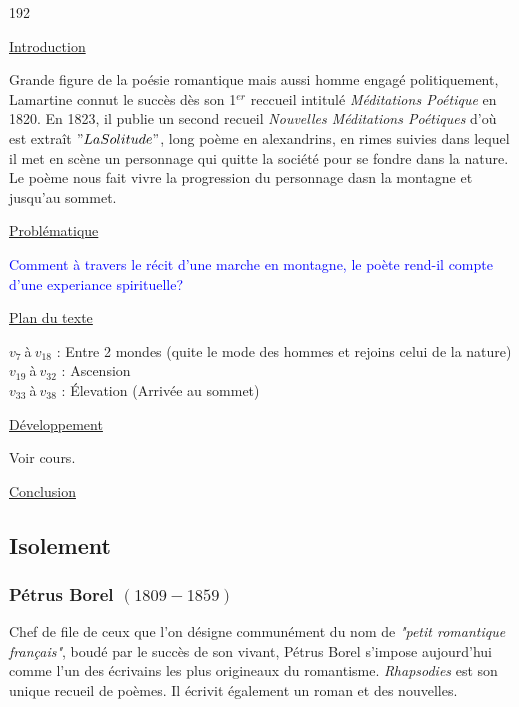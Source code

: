 \documentclass[12pt,a4paper]{article}
\begin{document}
\begin{dingautolist}{192}

\item \underline{Introduction} \par
		Grande figure de la po\'esie romantique mais aussi homme engag\'e politiquement, Lamartine connut le succ\`es d\`es son 1$^{er}$ reccueil intitul\'e \textit{M\'editations Po\'etique} en 1820. 
		En 1823, il publie un second recueil \textit{Nouvelles M\'editations Po\'etiques} d'o\`u est extra\^it $"La Solitude"$, 
		long po\`eme en alexandrins, en rimes suivies dans lequel il met en sc\`ene un personnage qui quitte la soci\'et\'e pour se fondre dans la nature. 
		Le po\`eme nous fait vivre la progression du personnage dasn la montagne et jusqu'au sommet.

\item \underline{Probl\'ematique }\par
		\textcolor{blue}{Comment \`a travers le r\'ecit d'une marche en montagne, le po\`ete rend-il compte d'une experiance spirituelle?}

\item \underline{Plan du texte} \par
		$v_{7}~$\`a$~v_{18}$ : Entre 2 mondes (quite le mode des hommes et rejoins celui de la nature)\\
		$v_{19}~$\`a$~v_{32}$ : Ascension\\
		$v_{33}~$\`a$~v_{38}$ : \'Elevation (Arriv\'ee au sommet)

\item \underline{D\'eveloppement} \par
		Voir cours.

\item \underline{Conclusion} \par


\end{dingautolist}
 \newpage

			\subsection{Isolement}
				\subsubsection{P\'etrus Borel $(1809-1859)$}
		Chef de file de ceux que l'on d\'esigne commun\'ement du nom de \textit{"petit romantique fran\c cais"}, boud\'e par le succ\`es de son vivant, 
		P\'etrus Borel s'impose aujourd'hui comme l'un des \'ecrivains les plus origineaux du romantisme. \textit{Rhapsodies} est son unique recueil de po\`emes. Il \'ecrivit \'egalement un roman et des nouvelles.
\end{document}
